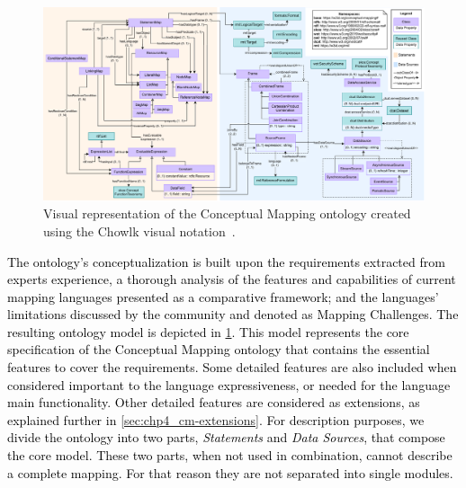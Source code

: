 \begin{figure}
    \centering
    \includegraphics[width=1\linewidth]{figures/chp4-2_cm_diagram.pdf}
    \caption[Conceptual Mapping ontology overview]{Visual representation of the Conceptual Mapping ontology created using the Chowlk visual notation~\parencite{feria2022chowlk}.}
    \label{fig:chp4-2_cm_diagram}
\end{figure}

\textcolor{black}{The ontology's conceptualization is built upon the requirements extracted from experts experience, a thorough analysis of the features and capabilities of current mapping languages presented as a comparative framework; and the languages' limitations discussed by the community and denoted as Mapping Challenges. The resulting ontology model is depicted in \cref{fig:chp4-2_cm_diagram}. This model represents the core specification of the Conceptual Mapping ontology that contains the essential features to cover the requirements. Some detailed features are also included when considered important to the language expressiveness, or needed for the language main functionality. Other detailed features are considered as extensions, as explained further in \cref{sec:chp4_cm-extensions}. For description purposes, we divide the ontology into two parts, \textit{Statements} and \textit{Data Sources}, that compose the core model. These two parts, when not used in combination, cannot describe a complete mapping. For that reason they are not separated into single modules. } 

